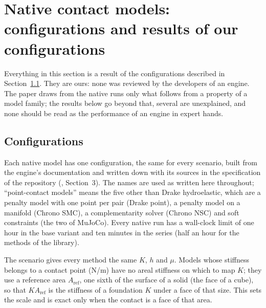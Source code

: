 \section{Native contact models: configurations and results of our configurations}\label{sup:natives}


Everything in this section is a result of the configurations described in
Section~\ref{sup:native-config}. They are ours: none was reviewed by the developers of an
engine. The paper draws from the native runs only what follows from a property of a model
family; the results below go beyond that, several are unexplained, and none should be read as
the performance of an engine in expert hands.

\subsection{Configurations}\label{sup:native-config}

Each native model has one configuration, the same for every scenario, built from the engine's
documentation and written down with its sources in the specification of the repository
(, Section~3). The names are used as written here throughout;
``point-contact models'' means the five other than Drake hydroelastic, which are a penalty
model with one point per pair (Drake point), a penalty model on a manifold (Chrono SMC), a
complementarity solver (Chrono NSC) and soft constraints (the two of MuJoCo). Every native run
has a wall-clock limit of one hour in the base variant and ten minutes in the series (half an
hour for the methods of the library).

The scenario gives every method the same $K$, $h$ and $\mu$. Models whose stiffness belongs to
a contact point (N/m) have no areal stiffness on which to map $K$; they use a reference area
$A_\mathrm{ref}$, one sixth of the surface of a solid (the face of a cube), so that
$K A_\mathrm{ref}$ is the stiffness of a foundation $K$ under a face of that size. This sets
the scale and is exact only when the contact is a face of that area.


